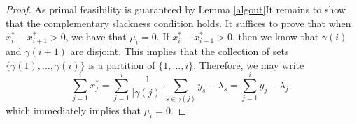 \documentclass{uwstat572}
\theoremstyle{remark}
\theoremstyle{definition}
\begin{document}
\begin{proof}
As primal feasibility is guaranteed by Lemma \ref{algout}It remains to show that the complementary slackness condition holds.  It suffices to prove that when $x_i^* - x_{i+1}^* > 0$, we have that $\mu_i = 0$.  If $x_i^* - x_{i+1}^* > 0$, then we know that $\gamma(i)$ and $\gamma(i+1)$ are disjoint.  This implies that the collection of sets $\{\gamma(1),...,\gamma(i)\}$ is a partition of $\{1,...,i\}$.  Therefore, we may write
\begin{equation*}
    \sum_{j=1}^i x_j^* = \sum_{j=1}^i \frac{1}{|\gamma(j)|} \sum_{s \in \gamma(j)} y_s - \lambda_s = \sum_{j=1}^i y_j - \lambda_j,
\end{equation*}
which immediately implies that $\mu_i = 0$.

\end{proof}
\end{document}
